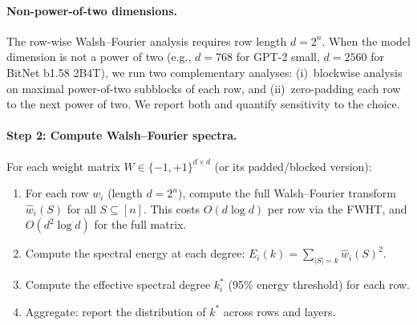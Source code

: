 \documentclass[12pt,a4paper]{article}
\theoremstyle{plain}
\theoremstyle{definition}
\theoremstyle{remark}
\newcommand{\pmone}{\{-1,+1\}}
\newcommand{\what}{\widehat{w}}
\begin{document}
\paragraph{Non-power-of-two dimensions.}
The row-wise Walsh--Fourier analysis requires row length $d = 2^n$. When the model dimension is not a power of two (e.g., $d = 768$ for GPT-2 small, $d = 2560$ for BitNet b1.58 2B4T), we run two complementary analyses: (i)~blockwise analysis on maximal power-of-two subblocks of each row, and (ii)~zero-padding each row to the next power of two. We report both and quantify sensitivity to the choice.

\paragraph{Step 2: Compute Walsh--Fourier spectra.}
For each weight matrix $W \in \pmone^{d \times d}$ (or its padded/blocked version):
\begin{enumerate}
    \item For each row $w_i$ (length $d = 2^n$), compute the full Walsh--Fourier transform $\what_i(S)$ for all $S \subseteq [n]$. This costs $O(d \log d)$ per row via the FWHT, and $O(d^2 \log d)$ for the full matrix.
    \item Compute the spectral energy at each degree: $E_i(k) = \sum_{|S|=k} \what_i(S)^2$.
    \item Compute the effective spectral degree $k^*_i$ (95\% energy threshold) for each row.
    \item Aggregate: report the distribution of $k^*$ across rows and layers.
\end{enumerate}
\end{document}
